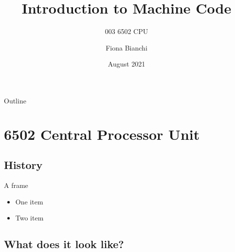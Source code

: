 \documentclass{beamer}
\title{Introduction to Machine Code}
\subtitle{003 6502 CPU}
\author{Fiona Bianchi}
\institute{HiKlas Ltd}
\date{August 2021}
\begin{document}
\begin{frame}
  \titlepage
\end{frame}

\begin{frame}{Outline}
  \tableofcontents
\end{frame}


\section{6502 Central Processor Unit}

\subsection[History]{History}

\begin{frame}{A frame}
  \begin{itemize}
  \item
    One item
  \item
    Two item
  \end{itemize}
\end{frame}


\subsection[Appearance]{What does it look like?}
\end{document}
